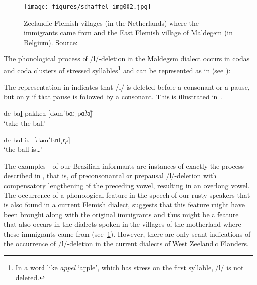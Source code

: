 \documentclass[output=paper,hidelinks,draftmode]{langscibook}
\begin{document}
\begin{figure}
\caption{Zeelandic Flemish villages (in the Netherlands) where the immigrants came from and the East Flemish village of Maldegem (in Belgium). Source: \citet[438]{SchaffelBremenkampPostma2017}}
\label{fig:schaffel:2} 
\texttt{[image: figures/schaffel-img002.jpg]}

\end{figure}

The phonological process of /l/-deletion in the Maldegem dialect occurs in codas and coda clusters of stressed syllables\footnote{In a word like \textit{appel} ‘apple’, which has stress on the first syllable, /l/ is not deleted.} and can be represented as in  (see \citealt[182--186]{Rys2007}):

\ea
\begin{exe}
\label{ex:schaffel:7}
\end{exe}
\z

The representation in  indicates that /l/ is deleted before a consonant or a pause, but only if that pause is followed by a consonant. This is illustrated in~.

\ea%
    \label{ex:schaffel:8}
\ea 
de ba\ul{l} pakken [dəmˈbɑːˌpɑʔ\~{ə̩}]\\ 
\glt ‘take the ball’

\ex 
de ba\ul{l} is\ldots [dəmˈbɑlˌɛ̝s]\\
\glt ‘the ball is\ldots’ 

\z
\z

\hspace*{-1mm}The examples - of our Brazilian informants are instances of exactly the process described in , that is, of preconsonantal or prepausal /l/-deletion with compensatory lengthening of the preceding vowel, resulting in an overlong vowel. The occurrence of a phonological feature in the speech of our rusty speakers that is also found in a current Flemish dialect, suggests that this feature might have been brought along with the original immigrants and thus might be a feature that also occurs in the dialects spoken in the villages of the motherland where these immigrants came from (see~\ref{fig:schaffel:2}). However, there are only scant indications of the occurrence of /l/-deletion in the current dialects of West Zeelandic Flanders.
\end{document}
